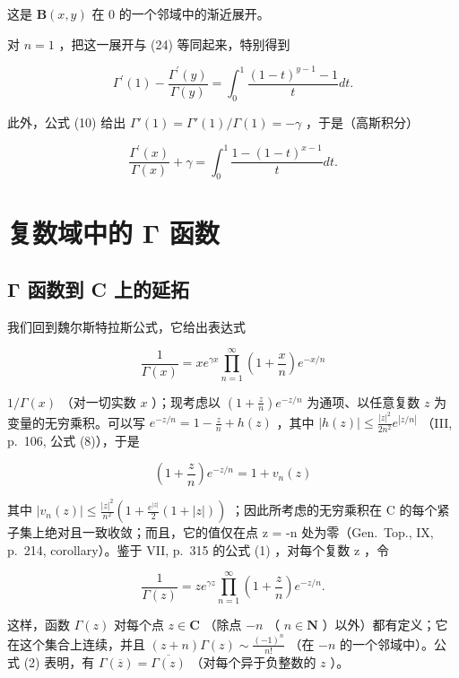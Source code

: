 这是 \(\mathbf{B}(x,y)\) 在 0 的一个邻域中的渐近展开。

对 \(n = 1\) ，把这一展开与 (24) 等同起来，特别得到

\[
\Gamma^ {\prime} (1) - \frac {\Gamma^ {\prime} (y)}{\Gamma (y)} = \int_ {0} ^ {1} \frac {(1 - t) ^ {y - 1} - 1}{t} d t.
\]

此外，公式 (10) 给出 \(\Gamma'(1) = \Gamma'(1)/\Gamma(1) = -\gamma\) ，于是（高斯积分）

\[
\frac {\Gamma^ {\prime} (x)}{\Gamma (x)} + \gamma = \int_ {0} ^ {1} \frac {1 - (1 - t) ^ {x - 1}}{t} d t.\tag{26}
\]

\section{复数域中的 Γ 函数}

\subsection{Γ 函数到 C 上的延拓}

我们回到魏尔斯特拉斯公式，它给出表达式

\[
\frac {1}{\Gamma (x)} = x e ^ {\gamma x} \prod_ {n = 1} ^ {\infty} \left(1 + \frac {x}{n}\right) e ^ {- x / n}\tag{1}
\]

\(1 / \Gamma (x)\) （对一切实数 \(x\) ）；现考虑以 \(\left(1 + \frac{z}{n}\right)e^{-z / n}\) 为通项、以任意复数 \(z\) 为变量的无穷乘积。可以写 \(e^{-z / n} = 1 - \frac{z}{n} + h(z)\) ，其中 \(|h(z)| \leqslant \frac{|z|^2}{2n^2} e^{|z / n|}\) （III, p.~106, 公式 (8)），于是

\[
\left(1 + \frac {z}{n}\right) e ^ {- z / n} = 1 + v _ {n} (z)
\]

其中 \(|v_{n}(z)| \leqslant \frac{|z|^{2}}{n^{2}}\left(1 + \frac{e^{|z|}}{2}(1 + |z|)\right)\) ；因此所考虑的无穷乘积在 C 的每个紧子集上绝对且一致收敛；而且，它的值仅在点 z = -n 处为零（Gen.~Top., IX, p.~214, corollary）。鉴于 VII, p.~315 的公式 (1) ，对每个复数 z ，令

\[
\frac {1}{\Gamma (z)} = z e ^ {\gamma z} \prod_ {n = 1} ^ {\infty} \left(1 + \frac {z}{n}\right) e ^ {- z / n}.\tag{2}
\]

这样，函数 \(\Gamma(z)\) 对每个点 \(z \in \mathbf{C}\) （除点 \(-n\) （ \(n \in \mathbf{N}\) ）以外）都有定义；它在这个集合上连续，并且 \((z + n)\Gamma(z) \sim \frac{(-1)^n}{n!}\) （在 \(-n\) 的一个邻域中）。公式 (2) 表明，有 \(\Gamma(\overline{z}) = \overline{\Gamma(z)}\) （对每个异于负整数的 \(z\) ）。

